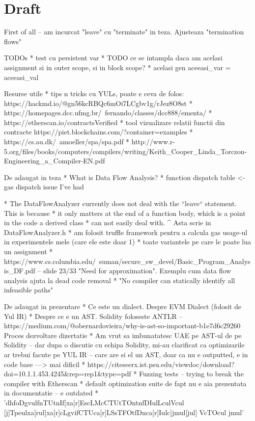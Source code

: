 \chapter*{Draft} 



First of all – am incurcat "leave" cu "terminate" in teza. Ajusteaza "termination flows"


TODOs
* test cu persistent var
* TODO ce se intampla daca am acelasi assignment si in outer scope, si in block scope?
* acelasi gen aceeasi_var = aceeasi_val

Resurse utile
* tips n tricks cu YULs, poate e ceva de folos: https://hackmd.io/@gn56kcRBQc6mOi7LCgbv1g/rJez8O8st
* https://homepages.dcc.ufmg.br/~fernando/classes/dcc888/ementa/
* https://etherscan.io/contractsVerified
* tool vizualizare relatii functii din contracte https://piet.blockchains.com/?container=examples%
* https://cs.au.dk/~amoeller/spa/spa.pdf
* http://www.r-5.org/files/books/computers/compilers/writing/Keith_Cooper_Linda_Torczon-Engineering_a_Compiler-EN.pdf


De adaugat in teza
* What is Data Flow Analysis?
* function dispatch table <- gas dispatch issue I've had

  * The DataFlowAnalyzer currently does not deal with the ``leave`` statement. This is because
  * it only matters at the end of a function body, which is a point in the code a derived class
  * can not easily deal with.
  ^ Asta scrie in DataFlowAnalyzer.h
* am folosit truffle framework pentru a calcula gas usage-ul in experimentele mele (care ele este doar 1)
* toate variantele pe care le poate lua un assignment
* https://www.cs.columbia.edu/~suman/secure_sw_devel/Basic_Program_Analysis_DF.pdf – slide 23/33 "Need for approximation". Exemplu cum data flow analysis ajuta la dead code removal
  * "No compiler can statically identify all infeasible paths"


De adaugat in prezentare
* Ce este un dialect. Despre EVM Dialect (folosit de Yul IR)
* Despre ce e un AST. Solidity foloseste ANTLR – https://medium.com/@obernardovieira/why-is-ast-so-important-b1e7d6c29260
Proces dezvoltare dizertatie
* Am vrut sa imbunatatesc UAE pe AST-ul de pe Solidity – dar dupa o discutie cu echipa Solidity, mi-au clarificat ca optimizarile ar trebui facute pe YUL IR – care are si el un AST, doar ca nu e outputted, e in code base ---> mai dificil
* https://citeseerx.ist.psu.edu/viewdoc/download?doi=10.1.1.453.4245&rep=rep1&type=pdf 
* Fuzzing tests – trying to break the compiler with Etherscan
* default optimization suite de fapt nu e aia prezentata in documentatie – e outdated
  * 'dhfoDgvulfnTUtnIf[xa[r]EscLMcCTUtTOntnfDIulLculVcul [j]Tpeulxa[rul]xa[r]cLgvifCTUca[r]LSsTFOtfDnca[r]Iulc]jmul[jul] VcTOcul jmul'

